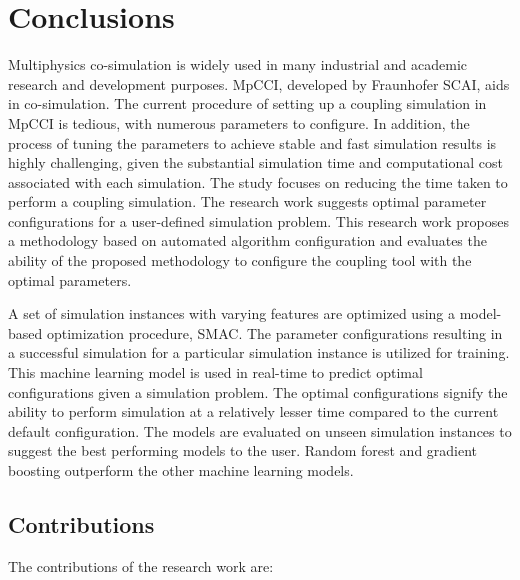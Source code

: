 
\chapter{Conclusions}

Multiphysics co-simulation is widely used in many industrial and academic research and development purposes. MpCCI, developed by Fraunhofer SCAI, aids in co-simulation. The current procedure of setting up a coupling simulation in MpCCI is tedious, with numerous parameters to configure. In addition, the process of tuning the parameters to achieve stable and fast simulation results is highly challenging, given the substantial simulation time and computational cost associated with each simulation. The study focuses on reducing the time taken to perform a coupling simulation. The research work suggests optimal parameter configurations for a user-defined simulation problem. This research work proposes a methodology based on automated algorithm configuration and evaluates the ability of the proposed methodology to configure the coupling tool with the optimal parameters.

A set of simulation instances with varying features are optimized using a model-based optimization procedure, SMAC. The parameter configurations resulting in a successful simulation for a particular simulation instance is utilized for training. This machine learning model is used in real-time to predict optimal configurations given a simulation problem. The optimal configurations signify the ability to perform simulation at a relatively lesser time compared to the current default configuration. The models are evaluated on unseen simulation instances to suggest the best performing models to the user. Random forest and gradient boosting outperform the other machine learning models. 


\section{Contributions}

The contributions of the research work are:

